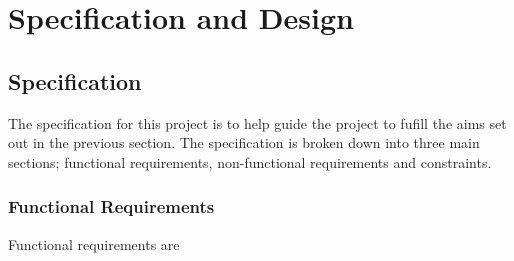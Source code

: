 \documentclass[12pt, conference, final, a4paper, onecolumn, compsoc]{IEEEtran}
\begin{document}


    \subsection*{} %


    \subsection*{} %


    \subsection*{} %


    \section{Specification and Design}

    \subsection*{Specification}

    The specification for this project is to help guide the project to fufill
    the aims set out in the previous section. The specification is broken down
    into three main sections; functional requirements, non-functional
    requirements and constraints.

    \subsubsection*{Functional Requirements}

    Functional requirements are



\end{document}
